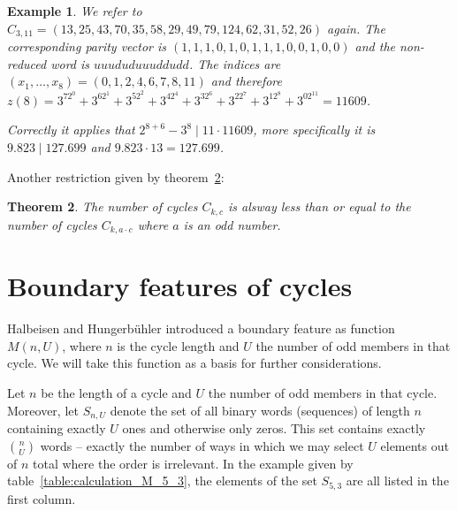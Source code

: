 \documentclass[12pt]{amsart}
\newtheorem{theorem}{Theorem}[section]
\newtheorem{example}[theorem]{Example}
\theoremstyle{definition}
\begin{document}
\begin{example}
We refer to $C_{3,11}=(13,25,43,70,35,58,29,49,79,124,62,31,52,26)$ again. The corresponding parity vector is $(1,1,1,0,1,0,1,1,1,0,0,1,0,0)$ and the non-reduced word is $uuududuuuddudd$. The indices are $(x_1,\ldots,x_8)=(0,1,2,4,6,7,8,11)$ and therefore $z(8)=3^72^0+3^62^1+3^52^2+3^42^4+3^32^6+3^22^7+3^12^8+3^02^{11}=11609$.

\par\medskip\noindent
Correctly it applies that $2^{8+6}-3^8\mid11\cdot11609$, more specifically it is $9.823\mid127.699$ and $9.823\cdot13=127.699$. 
\end{example}


\par\noindent
Another restriction given by theorem~\ref{theo:cycle_restriction_4}:

\begin{theorem}
	\label{theo:cycle_restriction_4}
	The number of cycles $C_{k,c}$ is alsway less than or equal to the number of cycles $C_{k,a\cdot c}$ where $a$ is an odd number.
\end{theorem}

\section{Boundary features of cycles}
Halbeisen and Hungerbühler \cite{Ref_Halbeisen_Hungerbuehler_1997} introduced a boundary feature as function $M(n,U)$, where $n$ is the cycle length and $U$ the number of odd members in that cycle. We will take this function as a basis for further considerations.

Let $n$ be the length of a cycle and $U$ the number of odd members in that cycle. Moreover, let $S_{n,U}$ denote the set of all binary words (sequences) of length $n$ containing exactly $U$ ones and otherwise only zeros. This set contains exactly $\binom{n}{U}$ words -- exactly the number of ways in which we may select $U$ elements out of $n$ total where the order is irrelevant. In the example given by table~\ref{table:calculation_M_5_3}, the elements of the set $S_{5,3}$ are all listed in the first column.
\end{document}
